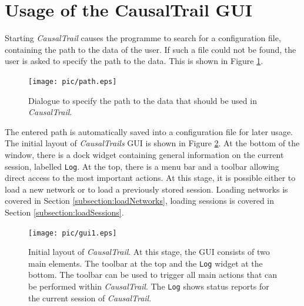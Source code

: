 \section{Usage of the CausalTrail GUI}
Starting \textit{CausalTrail} causes the programme to search for a configuration file, containing the path to the data of the user.
If such a file could not be found, the user is asked to specify the path to the data. This is shown in Figure \ref{figure:causalTrailPath}.
\begin{figure}[H]
  \begin{center}
 \texttt{[image: pic/path.eps]}
 \end{center}
 \caption{Dialogue to specify the path to the data that should be used in \textit{CausalTrail}.}
 \label{figure:causalTrailPath}
\end{figure}
\noindent
The entered path is automatically saved into a configuration file for later usage.
\\The initial layout of \textit{CausalTrails} GUI is shown in Figure \ref{figure:causalTrailInitial}. At the bottom of the window,
there is a dock widget containing general information on the current session, labelled \texttt{Log}. At the top, there is a menu bar and
a toolbar allowing direct access to the most important actions.
At this stage, it is possible either to load a new network or to load a previously stored session. Loading networks is
covered in Section \ref{subsection:loadNetworks}, loading sessions is covered in Section \ref{subsection:loadSessions}.
\begin{figure}[H]
 \texttt{[image: pic/gui1.eps]}
 \caption{Initial layout of \textit{CausalTrail}. At this stage, the GUI consists of two main elements. The toolbar at the top and the \texttt{Log} widget at the bottom.
 The toolbar can be used to trigger all main actions that can be performed within \textit{CausalTrail}. The \texttt{Log} shows status reports for the current session of \textit{CausalTrail}.}
 \label{figure:causalTrailInitial}
\end{figure}

